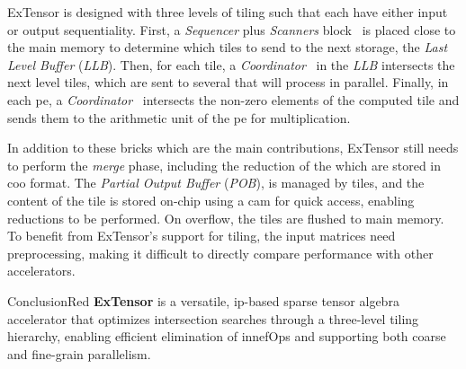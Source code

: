 ExTensor is designed with three levels of \gls{tiling} such that each have either input or output sequentiality.
First, a \textit{Sequencer} plus \textit{Scanners} block~ is placed close to the main memory to determine which \glspl{tile} to send to the next storage, the \textit{Last Level Buffer} (\textit{LLB}).
Then, for each \gls{tile}, a \textit{Coordinator}~ in the \textit{LLB} intersects the next level \glspl{tile}, which are sent to several  that will process in parallel.
Finally, in each \acrshort{pe}, a \textit{Coordinator}~ intersects the non-zero elements of the computed \gls{tile} and sends them to the arithmetic unit of the \acrshort{pe} for multiplication.

In addition to these bricks which are the main contributions, ExTensor still needs to perform the \textit{merge} phase, including the \gls{reduction} of the  which are stored in \acrshort{coo} format.
The \textit{Partial Output Buffer} (\textit{POB}), is managed by \glspl{tile}, and the content of the \gls{tile} is stored on-chip using a \acrfull{cam} for quick access, enabling \glspl{reduction} to be performed.
On overflow, the \glspl{tile} are flushed to main memory.
To benefit from ExTensor's support for \gls{tiling}, the input matrices need preprocessing, making it difficult to directly compare performance with other accelerators.

\begin{highlight}{Conclusion}{Red}
    \textbf{ExTensor} is a versatile, \acrshort{ip}-based sparse tensor algebra accelerator that optimizes \gls{intersection} searches through a three-level \gls{tiling} hierarchy, enabling efficient elimination of \glspl{innefOp} and supporting both coarse and fine-grain parallelism.
\end{highlight}